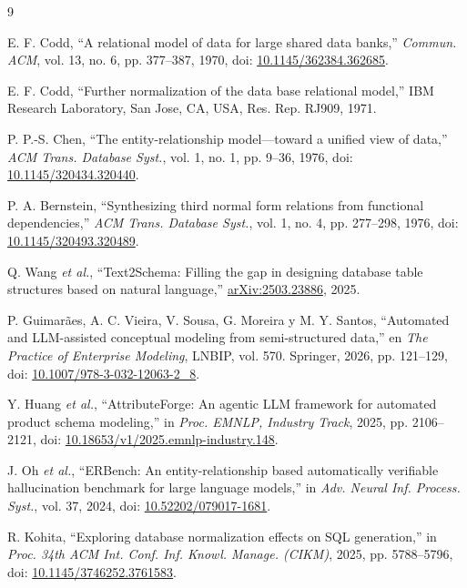 \documentclass[conference]{IEEEtran}
\begin{document}
\begin{thebibliography}{9}

E. F. Codd, “A relational model of data for large shared data banks,” \emph{Commun. ACM}, vol. 13, no. 6, pp. 377--387, 1970, doi: \href{https://doi.org/10.1145/362384.362685}{10.1145/362384.362685}.

E. F. Codd, “Further normalization of the data base relational model,” IBM Research Laboratory, San Jose, CA, USA, Res. Rep. RJ909, 1971.

P. P.-S. Chen, “The entity-relationship model---toward a unified view of data,” \emph{ACM Trans. Database Syst.}, vol. 1, no. 1, pp. 9--36, 1976, doi: \href{https://doi.org/10.1145/320434.320440}{10.1145/320434.320440}.

P. A. Bernstein, “Synthesizing third normal form relations from functional dependencies,” \emph{ACM Trans. Database Syst.}, vol. 1, no. 4, pp. 277--298, 1976, doi: \href{https://doi.org/10.1145/320493.320489}{10.1145/320493.320489}.

Q. Wang \emph{et al.}, “Text2Schema: Filling the gap in designing database table structures based on natural language,” \href{https://arxiv.org/abs/2503.23886}{arXiv:2503.23886}, 2025.

P. Guimarães, A. C. Vieira, V. Sousa, G. Moreira y M. Y. Santos, “Automated and LLM-assisted conceptual modeling from semi-structured data,” en \emph{The Practice of Enterprise Modeling}, LNBIP, vol. 570. Springer, 2026, pp. 121--129, doi: \href{https://doi.org/10.1007/978-3-032-12063-2_8}{10.1007/978-3-032-12063-2\_8}.

Y. Huang \emph{et al.}, “AttributeForge: An agentic LLM framework for automated product schema modeling,” in \emph{Proc. EMNLP, Industry Track}, 2025, pp. 2106--2121, doi: \href{https://doi.org/10.18653/v1/2025.emnlp-industry.148}{10.18653/v1/2025.emnlp-industry.148}.

J. Oh \emph{et al.}, “ERBench: An entity-relationship based automatically verifiable hallucination benchmark for large language models,” in \emph{Adv. Neural Inf. Process. Syst.}, vol. 37, 2024, doi: \href{https://doi.org/10.52202/079017-1681}{10.52202/079017-1681}.

R. Kohita, “Exploring database normalization effects on SQL generation,” in \emph{Proc. 34th ACM Int. Conf. Inf. Knowl. Manage. (CIKM)}, 2025, pp. 5788--5796, doi: \href{https://doi.org/10.1145/3746252.3761583}{10.1145/3746252.3761583}.

\end{thebibliography}
\end{document}
